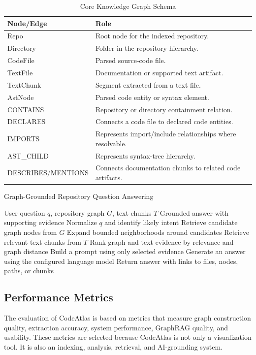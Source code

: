 \documentclass[conference]{IEEEtran}
\begin{document}
\begin{table}[!t]
\caption{Core Knowledge Graph Schema}
\label{tab:schema}
\centering
\begin{tabularx}{\columnwidth}{lY}
\toprule
\textbf{Node/Edge} & \textbf{Role} \\
\midrule
Repo & Root node for the indexed repository. \\
Directory & Folder in the repository hierarchy. \\
CodeFile & Parsed source-code file. \\
TextFile & Documentation or supported text artifact. \\
TextChunk & Segment extracted from a text file. \\
AstNode & Parsed code entity or syntax element. \\
CONTAINS & Repository or directory containment relation. \\
DECLARES & Connects a code file to declared code entities. \\
IMPORTS & Represents import/include relationships where resolvable. \\
AST\_CHILD & Represents syntax-tree hierarchy. \\
DESCRIBES/MENTIONS & Connects documentation chunks to related code artifacts. \\
\bottomrule
\end{tabularx}
\end{table}



\begin{algorithm}[!t]
\caption{Graph-Grounded Repository Question Answering}
\label{alg:graphrag}
\begin{algorithmic}[1]
\Require User question $q$, repository graph $G$, text chunks $T$
\Ensure Grounded answer with supporting evidence
\State Normalize $q$ and identify likely intent
\State Retrieve candidate graph nodes from $G$
\State Expand bounded neighborhoods around candidates
\State Retrieve relevant text chunks from $T$
\State Rank graph and text evidence by relevance and graph distance
\State Build a prompt using only selected evidence
\State Generate an answer using the configured language model
\State Return answer with links to files, nodes, paths, or chunks
\end{algorithmic}
\end{algorithm}



\subsection{Performance Metrics}
The evaluation of CodeAtlas is based on metrics that measure graph construction quality, extraction accuracy, system performance, GraphRAG quality, and usability. These metrics are selected because CodeAtlas is not only a visualization tool. It is also an indexing, analysis, retrieval, and AI-grounding system.
\end{document}
